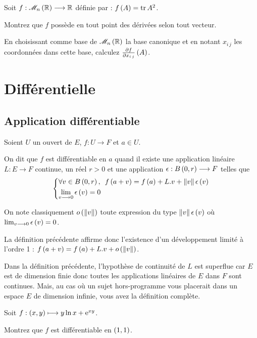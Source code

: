 \begin{exo}
Soit \(f:\M{n}[\R]\to\R\) définie par : \(f\left(A\right)=\operatorname{tr} A^2\).

Montrez que \(f\) possède en tout point des dérivées selon tout vecteur.

En choisissant comme base de \(\M{n}[\R]\) la base canonique et en notant \(x_{i\,j}\) les coordonnées dans cette base, calculez \(\pdv{f}{x_{i\,j}}\left(A\right)\).
\end{exo}

\section{Différentielle}

\subsection{Application différentiable}

\begin{defi}
Soient \(U\) un ouvert de \(E\), \(f:U\to F\) et \(a\in U\).

On dit que \(f\) est différentiable en \(a\) quand il existe une application linéaire \(L:E\to F\) continue, un réel \(r>0\) et une application \(\epsilon:B\left(0,r\right)\longrightarrow F\) telles que \[\begin{dcases}
\quantifs{\forall v\in\bouleo{0}{r}}f\paren{a+v}=f\paren{a}+L.v+\norme{v}\epsilon\paren{v} \\
\lim_{v\to0}\epsilon\paren{v}=0
\end{dcases}\]
\end{defi}

On note classiquement \(\o{\norme{v}}\) toute expression du type \(\norme{v}\epsilon\paren{v}\) où \(\lim_{v\longrightarrow0}\epsilon\left(v\right)=0\).

La définition précédente affirme donc l'existence d'un développement limité à l'ordre 1 : \(f\paren{a+v}=f\paren{a}+L.v+\o{\norme{v}}\).

\begin{rem}
Dans la définition précédente, l'hypothèse de continuité de \(L\) est superflue car \(E\) est de dimension finie donc toutes les applications linéaires de \(E\) dans \(F\) sont continues. Mais, au cas où un sujet hors-programme vous placerait dans un espace \(E\) de dimension infinie, vous avez la définition complète.
\end{rem}

\begin{exo}
Soit \(f:\left(x,y\right)\longmapsto y\ln x+\mathrm{e}^{xy}\).

Montrez que \(f\) est différentiable en \(\left(1,1\right)\).
\end{exo}

